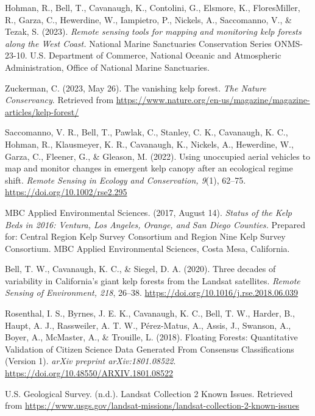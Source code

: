 \documentclass{article}
\begin{document}
\begin{thebibliography}{99} %

Hohman, R., Bell, T., Cavanaugh, K., Contolini, G., Elsmore, K., FloresMiller, R., Garza, C., Hewerdine, W., Iampietro, P., Nickels, A., Saccomanno, V., \& Tezak, S. (2023).
\textit{Remote sensing tools for mapping and monitoring kelp forests along the West Coast.}
National Marine Sanctuaries Conservation Series ONMS-23-10. U.S. Department of Commerce, National Oceanic and Atmospheric Administration, Office of National Marine Sanctuaries.

Zuckerman, C. (2023, May 26).
The vanishing kelp forest.
\textit{The Nature Conservancy}.
Retrieved from \url{https://www.nature.org/en-us/magazine/magazine-articles/kelp-forest/}

Saccomanno, V. R., Bell, T., Pawlak, C., Stanley, C. K., Cavanaugh, K. C., Hohman, R., Klausmeyer, K. R., Cavanaugh, K., Nickels, A., Hewerdine, W., Garza, C., Fleener, G., \& Gleason, M. (2022).
Using unoccupied aerial vehicles to map and monitor changes in emergent kelp canopy after an ecological regime shift.
\textit{Remote Sensing in Ecology and Conservation, 9}(1), 62--75.
\url{https://doi.org/10.1002/rse2.295}

MBC Applied Environmental Sciences. (2017, August 14).
\textit{Status of the Kelp Beds in 2016: Ventura, Los Angeles, Orange, and San Diego Counties.}
Prepared for: Central Region Kelp Survey Consortium and Region Nine Kelp Survey Consortium. MBC Applied Environmental Sciences, Costa Mesa, California.

Bell, T. W., Cavanaugh, K. C., \& Siegel, D. A. (2020).
Three decades of variability in California's giant kelp forests from the Landsat satellites.
\textit{Remote Sensing of Environment, 218}, 26--38.
\url{https://doi.org/10.1016/j.rse.2018.06.039}

Rosenthal, I. S., Byrnes, J. E. K., Cavanaugh, K. C., Bell, T. W., Harder, B., Haupt, A. J., Rassweiler, A. T. W., Pérez-Matus, A., Assis, J., Swanson, A., Boyer, A., McMaster, A., \& Trouille, L. (2018).
Floating Forests: Quantitative Validation of Citizen Science Data Generated From Consensus Classifications (Version 1).
\textit{arXiv preprint arXiv:1801.08522}.
\url{https://doi.org/10.48550/ARXIV.1801.08522}

U.S. Geological Survey. (n.d.).
Landsat Collection 2 Known Issues.
Retrieved from \url{https://www.usgs.gov/landsat-missions/landsat-collection-2-known-issues}

\end{thebibliography}
\endgroup %
\end{document}
